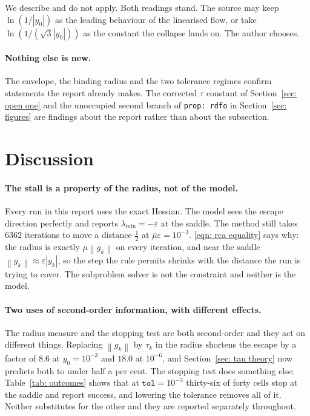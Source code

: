 \documentclass[11pt,a4paper]{article}
\providecommand{\abs}[1]{\left \vert #1 \right \vert}
\providecommand{\norm}[1]{\left \lVert #1 \right \rVert}
\theoremstyle{definition}
\theoremstyle{remark}
\begin{document}
We describe and do not apply. Both readings stand. The source may keep
$\ln(1/\abs{y_0})$ as the leading behaviour of the linearised flow, or take
$\ln(1/(\sqrt3\abs{y_0}))$ as the constant the collapse lands on. The author
chooses.

\paragraph{Nothing else is new.} The envelope, the binding radius and the two
tolerance regimes confirm statements the report already makes. The corrected
$\tau$ constant of Section~\ref{sec: open one} and the unoccupied second branch
of \texttt{prop: rdfo} in Section~\ref{sec: figures} are findings about the
report rather than about the subsection.

\section{Discussion}\label{sec: discussion}

\paragraph{The stall is a property of the radius, not of the model.}
Every run in this report uses the exact Hessian. The model sees the escape
direction perfectly and reports $\lambda_{\min} = -\varepsilon$ at the saddle.
The method still takes $6362$ iterations to move a distance $\tfrac12$ at
$\overline{\mu}\varepsilon = 10^{-3}$. \eqref{eqn: rca equality} says why: the
radius is exactly $\overline{\mu}\norm{g_k}$ on every iteration, and near the
saddle $\norm{g_k} \approx \varepsilon\abs{y_k}$, so the step the rule permits
shrinks with the distance the run is trying to cover. The subproblem solver is
not the constraint and neither is the model.

\paragraph{Two uses of second-order information, with different effects.}
The radius measure and the stopping test are both second-order and they act on
different things. Replacing $\norm{g_k}$ by $\tau_k$ in the radius shortens the
escape by a factor of $8.6$ at $y_0 = 10^{-3}$ and $18.0$ at $10^{-6}$, and
Section~\ref{sec: tau theory} now predicts both to under half a per cent. The
stopping test does something else: Table~\ref{tab: outcomes} shows that at
$\texttt{tol} = 10^{-5}$ thirty-six of forty cells stop at the saddle and report
success, and lowering the tolerance removes all of it. Neither substitutes for
the other and they are reported separately throughout.
\end{document}
